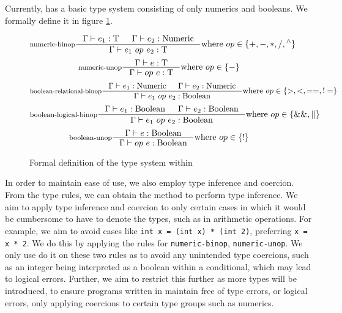 Currently, \rimp has a basic type system consisting of only numerics and booleans. 
We formally define it in figure \ref{fig:type-system}.
\begin{figure}[hbt!]
    \centering
    \[
        \inference[numeric-binop]{
        \Gamma \vdash e_1 : \text{T} & \Gamma \vdash e_2 : \text{Numeric} 
        }{
        \Gamma \vdash e_1\ op\ e_2 : \text{T}
        }
        \text{where } op\in \{+, -, *, /, {}^\land\}
    \]
    \vspace{0.1cm}
    \[
        \inference[numeric-unop]{
        \Gamma \vdash e : \text{T}
        }{
        \Gamma \vdash op\ e : \text{T}
        } \text{where } op\in \{-\}
    \]
    \vspace{0.1cm}
    \[
        \inference[boolean-relational-binop]{
        \Gamma \vdash e_1 : \text{Numeric} & \Gamma \vdash e_2 : \text{Numeric} 
        }{
        \Gamma \vdash e_1\ op\ e_2 : \text{Boolean}
        } \text{where } op\in \{>, <, ==, !=\}
    \]
    \vspace{0.1cm}
    \[
        \inference[boolean-logical-binop]{
        \Gamma \vdash e_1 : \text{Boolean} & \Gamma \vdash e_2 : \text{Boolean} 
        }{
        \Gamma \vdash e_1\ op\ e_2 : \text{Boolean}
        } \text{where } op\in \{\&\&, ||\}
    \]
    \vspace{0.1cm}
    \[
        \inference[boolean-unop]{
        \Gamma \vdash e : \text{Boolean} 
        }{
        \Gamma \vdash op\ e : \text{Boolean}
        } \text{where } op\in \{!\}
    \]
    \caption{Formal definition of the type system within \rimp}
    \label{fig:type-system}
\end{figure}

In order to maintain ease of use, we also employ type inference and coercion. From the type rules, we can obtain the method to perform type inference. We aim to apply type inference and coercion to only certain cases in which it would be cumbersome to have to denote the types, such as in arithmetic operations. For example, we aim to avoid cases like \lstinline{int x = (int x) * (int 2)}, preferring \lstinline{x = x * 2}.
We do this by applying the rules for \lstinline{numeric-binop}, \lstinline{numeric-unop}. We only use do it on these two rules as to avoid any unintended type coercions, such as an integer being interpreted as a boolean within a conditional, which may lead to logical errors. Further, we aim to restrict this further as more types will be introduced, to ensure programs written in \rimp maintain free of type errors, or logical errors, only applying coercions to certain type groups such as numerics.

